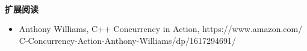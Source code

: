 \noindent\textbf{}\ \par
\textbf{扩展阅读} \ \par
\begin{itemize}
	\item Anthony Williams, C++ Concurrency in Action,  https:/​/​www.​amazon.​com/​C-Concurrency-​Action-​Anthony-​Williams/​dp/​1617294691/​
\end{itemize}


\newpage


















